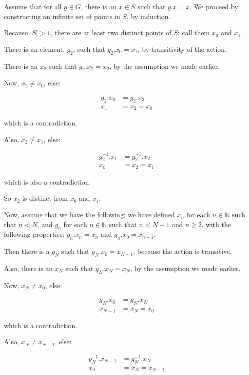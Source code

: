 \documentclass[a4paper,12pt]{article}
\newcommand{\tab}{\hspace{4mm}} %
\newcommand{\absval}[1]{\lvert #1 \rvert}
\newcommand{\N}{\mathbb{N}}
\begin{document}
Assume that for all $g \in G$, there is an $x \in S$ such that $g.x=x$. We proceed by constructing an infinite set of points in $S$, by induction.

\tab Because $\absval{S} >1$, there are at least two distinct points of $S$: call them $x_0$ and $x_1$.

\tab There is an element, $g_2$, such that $g_2.x_0=x_1$, by transitivity of the action.

\tab There is an $x_2$ such that $g_2.x_2 = x_2$, by the assumption we made earlier.

\tab Now, $x_2 \neq x_0$, else:

\begin{align*}
g_2.x_0 &= g_2.x_2\\
x_1&= x_2=x_0
\end{align*}

\tab which is a contradiction.

\tab Also, $x_2 \neq x_1$, else:

\begin{align*}
g_2^{-1}.x_1 &= g_2^{-1}.x_2\\
x_0&= x_2=x_1
\end{align*} 

\tab which is also a contradiction.

\tab So $x_2$ is distinct from $x_0$ and $x_1$.

\tab Now, assume that we have the following: we have defined $x_n$ for each $n \in \N$ such that $n < N$, and $g_n$ for each $n \in \N$ such that $n < N-1$ and $n \geq 2$, with the following properties: $g_n.x_n = x_n$ and $g_n.x_0 = x_{n-1}$.

\tab Then there is a $g_N$ such that $g_N.x_0 = x_{N-1}$, because the action is transitive.

\tab Also, there is an $x_N$ such that $g_N.x_N = x_N$, by the assumption we made earlier.

\tab Now, $x_N \neq x_0$, else:

\begin{align*}
g_N.x_0 &= g_N.x_N\\
x_{N-1}&= x_N=x_0
\end{align*}

\tab which is a contradiction.

\tab Also, $x_N \neq x_{N-1}$, else:

\begin{align*}
g_N^{-1}.x_{N-1} &= g_N^{-1}.x_N\\
x_0&= x_N=x_{N-1}
\end{align*} 
\end{document}
